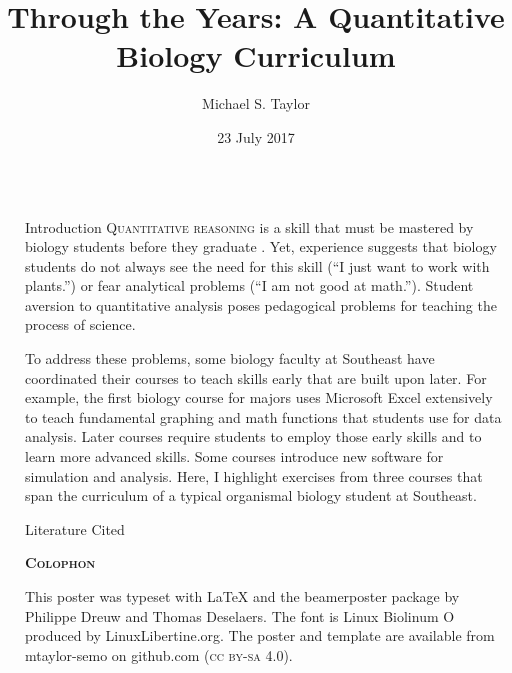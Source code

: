 \documentclass[final,hyperref={pdfpagelabels=false}]{beamer}
\title[Analysis in the Classroom]{Through the Years: A Quantitative Biology Curriculum}
\author[Taylor]{Michael S. Taylor}
\institute[SEMO]{Department of Biology}
\date{23 July 2017}
\newcommand{\whitespace}{\vspace{0.5\baselineskip}}
\newlength{\sepwid}
\newlength{\onecolwid}
\begin{document}

\begin{frame}[t]
\begin{columns}[t]
	\begin{column}{\sepwid} %
	\end{column}
	\begin{column}{\onecolwid}
    	\begin{block}{Introduction}
    		\textsc{Quantitative reasoning} is a skill that must be mastered by biology students before they graduate \citetext{; ; \citealp{hurney2011closing}}. Yet, experience suggests that biology students do not always see the need for this skill (“I just want to work with plants.”) or fear analytical problems (“I am not good at math.”). Student aversion to quantitative analysis poses pedagogical problems for teaching the process of science.
    		
    		\whitespace

			To address these problems, some biology faculty at Southeast have coordinated their courses to teach skills early that are built upon later. For example, the first  biology course for majors uses Microsoft Excel extensively to teach fundamental graphing and math functions that students use for data analysis. Later courses require students to employ those early skills and to learn more advanced skills. Some courses introduce new software for simulation and analysis. Here, I highlight exercises from three courses that span the curriculum of a typical organismal biology student at Southeast.  
    	\end{block}

		\vspace*{\sepwid}

		\begin{block}{Literature Cited}
			\setlength{\bibhang}{0.5em}
			
			\raggedright
			{\small }
		\end{block}

		\vspace*{0.5\sepwid}
		
		\textcolor{river}{\textbf{\textsc{Colophon}}}
		
			{\justifying\small This poster was typeset with \LaTeX{} and the beamerposter package by Philippe Dreuw and Thomas Deselaers. The font is Linux Biolinum O produced by LinuxLibertine.org. The poster and template are available from mtaylor-semo on github.com  (\textsc{cc by-sa 4.0}).}
		


\end{column}
\end{columns}
\end{frame}
\end{document}
